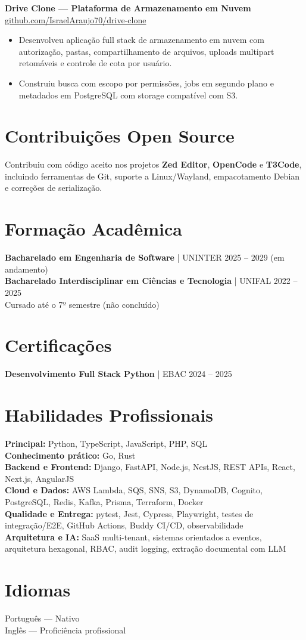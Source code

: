 \documentclass[a4paper,10pt]{article}
\begin{document}
\textbf{Drive Clone — Plataforma de Armazenamento em Nuvem} \hfill \href{https://github.com/IsraelAraujo70/drive-clone}{github.com/IsraelAraujo70/drive-clone}
\begin{itemize}[leftmargin=*, itemsep=1pt]
    \item Desenvolveu aplicação full stack de armazenamento em nuvem com autorização, pastas, compartilhamento de arquivos, uploads multipart retomáveis e controle de cota por usuário.
    \item Construiu busca com escopo por permissões, jobs em segundo plano e metadados em PostgreSQL com storage compatível com S3.
\end{itemize}

\section*{Contribuições Open Source}
Contribuiu com código aceito nos projetos \textbf{Zed Editor}, \textbf{OpenCode} e \textbf{T3Code}, incluindo ferramentas de Git, suporte a Linux/Wayland, empacotamento Debian e correções de serialização.

\section*{Formação Acadêmica}
\textbf{Bacharelado em Engenharia de Software} | UNINTER \hfill 2025 -- 2029 (em andamento)\\
\textbf{Bacharelado Interdisciplinar em Ciências e Tecnologia} | UNIFAL \hfill 2022 -- 2025\\
Cursado até o 7º semestre (não concluído)

\section*{Certificações}
\textbf{Desenvolvimento Full Stack Python} | EBAC \hfill 2024 -- 2025

\section*{Habilidades Profissionais}
\textbf{Principal:} Python, TypeScript, JavaScript, PHP, SQL\\
\textbf{Conhecimento prático:} Go, Rust\\
\textbf{Backend e Frontend:} Django, FastAPI, Node.js, NestJS, REST APIs, React, Next.js, AngularJS\\
\textbf{Cloud e Dados:} AWS Lambda, SQS, SNS, S3, DynamoDB, Cognito, PostgreSQL, Redis, Kafka, Prisma, Terraform, Docker\\
\textbf{Qualidade e Entrega:} pytest, Jest, Cypress, Playwright, testes de integração/E2E, GitHub Actions, Buddy CI/CD, observabilidade\\
\textbf{Arquitetura e IA:} SaaS multi-tenant, sistemas orientados a eventos, arquitetura hexagonal, RBAC, audit logging, extração documental com LLM


\section*{Idiomas}
Português — Nativo\\
Inglês — Proficiência profissional
\end{document}

